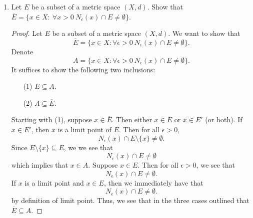 \documentclass[a4paper]{article}
\begin{document}
\begin{enumerate}
\begin{proof}
\begin{enumerate}
               and we are done.
            \item[(2)] Let \( \{ {F}_{i} : 1 \leq i \leq n  \}  \) be a finite collection of closed sets \( {F}_{i} \). We want to show that \( \bigcup_{ i=1 }^{ n } {F}_{i} \) is a closed set. It suffices to show that the complement of this set, that is \( \Big(  \bigcup_{ i=1 }^{ n } {F}_{i} \Big)^{c} \) is open. Observe that
                \[ \Big(  \bigcup_{ i=1 }^{ n } {F}_{i} \Big)^{c} = \bigcap_{ i=1 }^{ n } {F}_{i}^{c}.  \]
                Note that each \( {F}_{i}^{c} \) is open if and only if each \( {F}_{i} \) is closed. Thus, the finite intersection of each open set \( {F}_{i}^{c}  \) is open; that is,
                \[ \Big(  \bigcup_{ i=1 }^{ n } {F}_{i} \Big)^{c} = \bigcap_{ i=1 }^{ n } {F}_{i}^{c} \ \text{is open}.  \]
                Hence, the finite union of closed sets
                \[  \bigcup_{ i=1 }^{ n } {F}_{i} \ \text{is closed}. \]
        \end{enumerate}
        \end{proof}
    \item Let \( E  \) be a subset of a metric space \( (X,d ) \). Show that \( \overline{E} = \{ x \in X : \ \forall x > 0 \ {N}_{\epsilon}(x) \cap E \neq \emptyset \}  \).
    \begin{proof}
        Let \( E  \) be a subset of a metric space \( (X,d) \). We want to show that 
        \[ \overline{E} =\{  x \in X : \forall   \epsilon > 0 \ {N}_{\epsilon}(x) \cap E \neq \emptyset \}.  \] 
        Denote 
        \[  A = \{  x \in X : \forall  \epsilon > 0 \ {N}_{\epsilon}(x) \cap E \neq \emptyset \}.   \]
        It suffices to show the following two inclusions:
        \begin{enumerate}
            \item[(1)] \( \overline{E} \subseteq A \).
            \item[(2)] \( A \subseteq \overline{E} \).
        \end{enumerate}
        Starting with (1), suppose \( x \in \overline{E} \). Then either \( x \in E  \) or \( x \in E' \) (or both). If \( x \in E'  \), then \( x  \) is a limit point of \( E  \). Then for all \( \epsilon > 0  \),
        \[  {N}_{\epsilon}(x) \cap E \setminus  \{ x \}  \neq \emptyset. \]
        Since \( E \setminus  \{ x \} \subseteq E  \), we we see that 
        \[  {N}_{\epsilon}(x) \cap E \neq \emptyset \]
        which implies that \( x \in A \). Suppose \( x \in E  \). Then for all \( \epsilon > 0 \), we see that  
        \[  {N}_{\epsilon}(x) \cap E \neq \emptyset. \]
        If \( x  \) is a limit point and \( x \in E  \), then we immediately have that 
        \[  {N}_{\epsilon}(x) \cap E \neq \emptyset.  \]
        by definition of limit point. Thus, we see that in the three cases outlined that \( \overline{E} \subseteq A  \).
       

\end{proof}
\end{enumerate}
\end{document}
